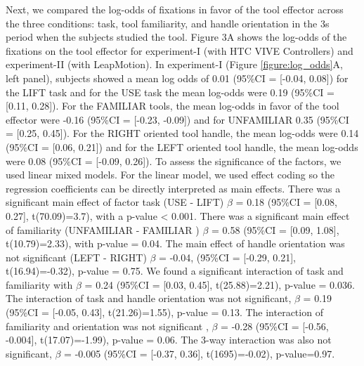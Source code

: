 Next, we compared the log-odds of fixations in favor of the tool effector across the three conditions: task, tool familiarity, and handle orientation in the 3s period when the subjects studied the tool. Figure 3A shows the log-odds of the fixations on the tool effector for experiment-I (with HTC VIVE Controllers) and experiment-II (with LeapMotion). In experiment-I (Figure \ref{figure:log_odds}A, left panel), subjects showed a mean log odds of 0.01 (95\%CI = [-0.04, 0.08]) for the LIFT task and for the USE task the mean log-odds were 0.19 (95\%CI = [0.11, 0.28]). For the FAMILIAR tools, the mean log-odds in favor of the tool effector were -0.16 (95\%CI = [-0.23, -0.09]) and for UNFAMILIAR 0.35 (95\%CI = [0.25, 0.45]). For the  RIGHT oriented tool handle, the mean log-odds were 0.14 (95\%CI = [0.06, 0.21]) and for the LEFT oriented tool handle, the mean log-odds were 0.08 (95\%CI = [-0.09, 0.26]). To assess the significance of the factors, we used linear mixed models. For the linear model, we used effect coding so the regression coefficients can be directly interpreted as main effects. There was a significant main effect of factor task (USE - LIFT) $\beta$ = 0.18 (95\%CI = [0.08, 0.27], t(70.09)=3.7), with a p-value < 0.001. There was a significant main effect of familiarity (UNFAMILIAR - FAMILIAR ) $\beta$ = 0.58  (95\%CI = [0.09, 1.08], t(10.79)=2.33), with p-value = 0.04. The main effect of handle orientation was not significant (LEFT - RIGHT) $\beta$ = -0.04, (95\%CI = [-0.29, 0.21], t(16.94)=-0.32), p-value = 0.75. We found a significant interaction of task and familiarity with $\beta$ = 0.24  (95\%CI = [0.03, 0.45], t(25.88)=2.21), p-value = 0.036. The interaction of task and handle orientation was not significant, $\beta$ = 0.19  (95\%CI = [-0.05, 0.43], t(21.26)=1.55), p-value = 0.13. The interaction of familiarity and orientation was not significant , $\beta$ = -0.28  (95\%CI = [-0.56, -0.004], t(17.07)=-1.99), p-value = 0.06. The 3-way interaction was also not significant, $\beta$ = -0.005  (95\%CI = [-0.37, 0.36], t(1695)=-0.02), p-value=0.97.

